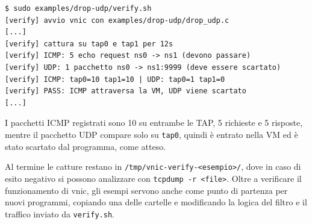 \noindent\begin{minipage}{\linewidth}
\begin{lstlisting}[style=terminale, caption={Output di \texttt{verify.sh} per l'esempio \texttt{drop-udp}, versione in eBPF}, label={lst:verify-udp}]
$ sudo examples/drop-udp/verify.sh
[verify] avvio vnic con examples/drop-udp/drop_udp.c
[...]
[verify] cattura su tap0 e tap1 per 12s
[verify] ICMP: 5 echo request ns0 -> ns1 (devono passare)
[verify] UDP: 1 pacchetto ns0 -> ns1:9999 (deve essere scartato)
[verify] ICMP: tap0=10 tap1=10 | UDP: tap0=1 tap1=0
[verify] PASS: ICMP attraversa la VM, UDP viene scartato
[...]
\end{lstlisting}
\end{minipage}

I pacchetti ICMP registrati sono 10 su entrambe le TAP, 5 richieste e 5 risposte, mentre il pacchetto UDP compare solo su \texttt{tap0}, quindi è entrato nella VM ed è stato scartato dal programma, come atteso.

Al termine le catture restano in \texttt{/tmp/vnic-verify-<esempio>/}, dove in caso di esito negativo si possono analizzare con \texttt{tcpdump -r <file>}. Oltre a verificare il funzionamento di vnic, gli esempi servono anche come punto di partenza per nuovi programmi, copiando una delle cartelle e modificando la logica del filtro e il traffico inviato da \texttt{verify.sh}.
